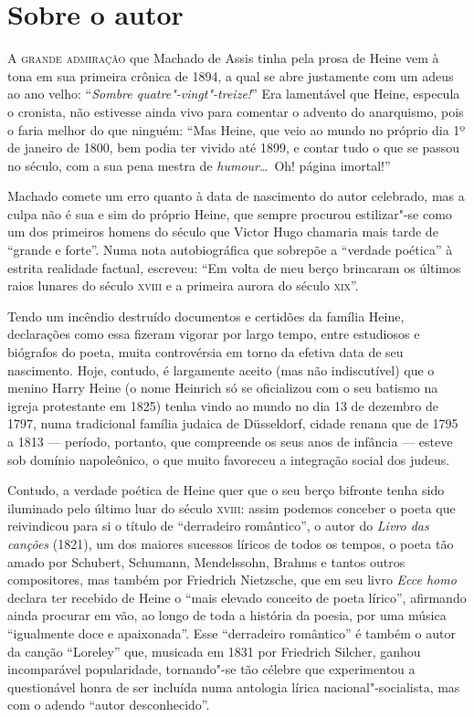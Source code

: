 

\section{Sobre o autor}

\textsc{A grande admiração} que Machado de Assis tinha pela prosa de Heine vem à
tona em sua primeira crônica de 1894, a qual se abre justamente com um
adeus ao ano velho: “\textit{Sombre quatre"-vingt"-treize!}” Era
lamentável que Heine, especula o cronista, não estivesse ainda vivo
para comentar o advento do anarquismo, pois o faria melhor do que
ninguém: “Mas Heine, que veio ao mundo no próprio dia 1º de janeiro de
1800, bem podia ter vivido até 1899, e contar tudo o que se passou no
século, com a sua pena mestra de \textit{humour}\ldots\ Oh! página
imortal!”

Machado comete um erro quanto à data de nascimento do autor celebrado,
mas a culpa não é sua e sim do próprio Heine, que sempre procurou
estilizar"-se como um dos primeiros homens do século que Victor Hugo
chamaria mais tarde  de “grande e forte”. Numa nota autobiográfica que
sobrepõe a “verdade poética” à estrita realidade factual, escreveu: “Em
volta de meu berço brincaram os últimos raios lunares do século \textsc{xviii} e
a primeira aurora do século \textsc{xix}”.

Tendo um incêndio destruído documentos e certidões da família Heine,
declarações como essa fizeram vigorar por largo tempo, entre estudiosos
e biógrafos do poeta, muita controvérsia em torno da efetiva data de
seu nascimento. Hoje, contudo, é largamente aceito (mas não
indiscutível) que o menino Harry Heine (o nome Heinrich só se
oficializou com o seu batismo na igreja protestante em 1825) tenha
vindo ao mundo no dia 13 de dezembro de 1797, numa tradicional família
judaica de Düsseldorf, cidade renana que de 1795 a 1813 --- período,
portanto, que compreende os seus anos de infância --- esteve sob domínio
napoleônico, o que muito favoreceu a integração social dos judeus.

Contudo, a verdade poética de Heine quer que o seu berço bifronte tenha
sido iluminado pelo último luar do século \textsc{xviii}: assim podemos conceber
o poeta que reivindicou para si o título de “derradeiro romântico”, o
autor do \textit{Livro das canções} (1821), um dos maiores sucessos
líricos de todos os tempos, o poeta tão amado por Schubert, Schumann,
Mendelssohn, Brahms e tantos outros compositores, mas também por
Friedrich Nietzsche, que em seu livro \textit{Ecce homo} declara ter
recebido de Heine o “mais elevado conceito de poeta lírico”, afirmando
ainda procurar em vão, ao longo de toda a história da poesia, por uma
música “igualmente doce e apaixonada”. Esse “derradeiro romântico” é
também o autor da canção “Loreley” que, musicada em 1831 por Friedrich
Silcher, ganhou incomparável popularidade, tornando"-se tão célebre
que experimentou a questionável honra de ser incluída numa antologia
lírica nacional"-socialista, mas com o adendo “autor desconhecido”.

